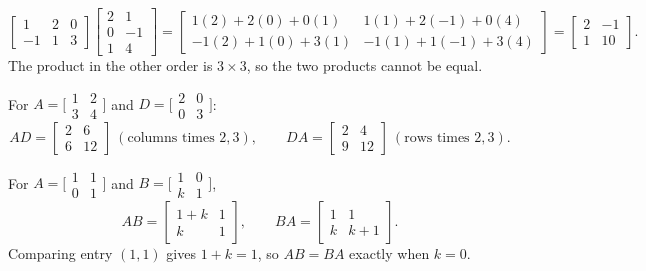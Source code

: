 \documentclass[10pt]{scrartcl}
\begin{document}
\begin{example*}
\[
  \begin{bmatrix}1&2&0\\-1&1&3\end{bmatrix}\begin{bmatrix}2&1\\0&-1\\1&4\end{bmatrix}
  =\begin{bmatrix}1(2)+2(0)+0(1) & 1(1)+2(-1)+0(4)\\ -1(2)+1(0)+3(1) & -1(1)+1(-1)+3(4)\end{bmatrix}
  =\begin{bmatrix}2&-1\\1&10\end{bmatrix}.
\]
The product in the other order is $3\times3$, so the two products cannot be equal.
\end{example*}

\begin{example*}
For $A=\bigl[\begin{smallmatrix}1&2\\3&4\end{smallmatrix}\bigr]$ and $D=\bigl[\begin{smallmatrix}2&0\\0&3\end{smallmatrix}\bigr]$:
\[
  AD=\begin{bmatrix}2&6\\6&12\end{bmatrix}\ (\text{columns times }2,3),\qquad
  DA=\begin{bmatrix}2&4\\9&12\end{bmatrix}\ (\text{rows times }2,3).
\]
\end{example*}

\begin{example*}
For $A=\bigl[\begin{smallmatrix}1&1\\0&1\end{smallmatrix}\bigr]$ and $B=\bigl[\begin{smallmatrix}1&0\\k&1\end{smallmatrix}\bigr]$,
\[
  AB=\begin{bmatrix}1+k&1\\k&1\end{bmatrix},\qquad BA=\begin{bmatrix}1&1\\k&k+1\end{bmatrix}.
\]
Comparing entry $(1,1)$ gives $1+k=1$, so $AB=BA$ exactly when $k=0$.
\end{example*}
\end{document}

